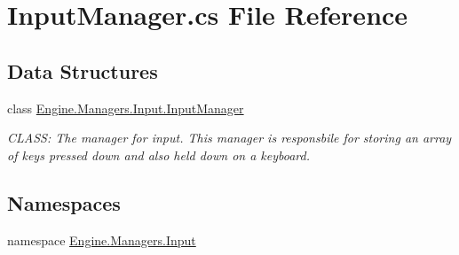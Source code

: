 \hypertarget{a00173}{}\section{Input\+Manager.\+cs File Reference}
\label{a00173}
\subsection*{Data Structures}
\begin{DoxyCompactItemize}
\item 
class \hyperlink{a00522}{Engine.\+Managers.\+Input.\+Input\+Manager}
\begin{DoxyCompactList}\small\item\em C\+L\+A\+SS\+: The manager for input. This manager is responsbile for storing an array of keys pressed down and also held down on a keyboard. \end{DoxyCompactList}\end{DoxyCompactItemize}
\subsection*{Namespaces}
\begin{DoxyCompactItemize}
\item 
namespace \hyperlink{a00270}{Engine.\+Managers.\+Input}
\end{DoxyCompactItemize}
